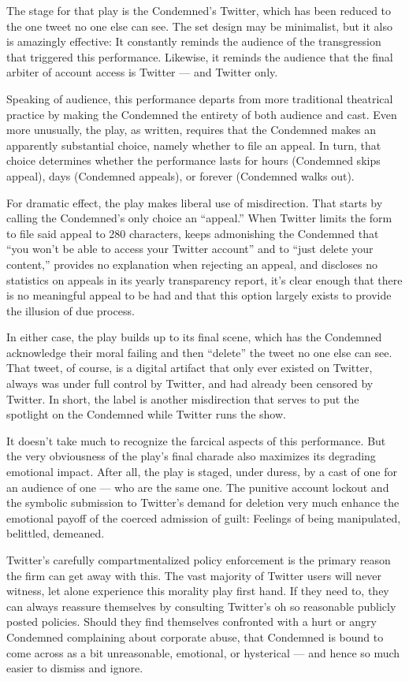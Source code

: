 The stage for that play is the Condemned's Twitter, which has been reduced to
the one tweet no one else can see. The set design may be minimalist, but it also
is amazingly effective: It constantly reminds the audience of the transgression
that triggered this performance. Likewise, it reminds the audience that the
final arbiter of account access is Twitter — and Twitter only.

Speaking of audience, this performance departs from more traditional theatrical
practice by making the Condemned the entirety of both audience and cast. Even
more unusually, the play, as written, requires that the Condemned makes an
apparently substantial choice, namely whether to file an appeal. In turn, that
choice determines whether the performance lasts for hours (Condemned skips
appeal), days (Condemned appeals), or forever (Condemned walks out).

For dramatic effect, the play makes liberal use of misdirection. That starts by
calling the Condemned's only choice an ``appeal.'' When Twitter limits the form
to file said appeal to 280 characters, keeps admonishing the Condemned that
``you won't be able to access your Twitter account'' and to ``just delete your
content,'' provides no explanation when rejecting an appeal, and discloses no
statistics on appeals in its yearly transparency report, it's clear enough that
there is no meaningful appeal to be had and that this option largely exists to
provide the illusion of due process.

In either case, the play builds up to its final scene, which has the Condemned
acknowledge their moral failing and then “delete” the tweet no one else can see.
That tweet, of course, is a digital artifact that only ever existed on Twitter,
always was under full control by Twitter, and had already been censored by
Twitter. In short, the label is another misdirection that serves to put the
spotlight on the Condemned while Twitter runs the show.

It doesn't take much to recognize the farcical aspects of this performance. But
the very obviousness of the play's final charade also maximizes its degrading
emotional impact. After all, the play is staged, under duress, by a cast of one
for an audience of one — who are the same one. The punitive account lockout and
the symbolic submission to Twitter's demand for deletion very much enhance the
emotional payoff of the coerced admission of guilt: Feelings of being
manipulated, belittled, demeaned.

Twitter's carefully compartmentalized policy enforcement is the primary reason
the firm can get away with this. The vast majority of Twitter users will never
witness, let alone experience this morality play first hand. If they need to,
they can always reassure themselves by consulting Twitter's oh so reasonable
publicly posted policies. Should they find themselves confronted with a hurt or
angry Condemned complaining about corporate abuse, that Condemned is bound to
come across as a bit unreasonable, emotional, or hysterical — and hence so much
easier to dismiss and ignore.

